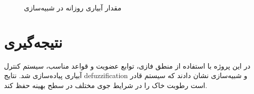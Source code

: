 \documentclass[a4paper,12pt]{article}
\begin{document}
	\begin{figure}[h]
		\centering
		\caption{مقدار آبیاری روزانه در شبیه‌سازی}
	\end{figure}
	
	\section{نتیجه‌گیری}
	در این پروژه با استفاده از منطق فازی، توابع عضویت و قواعد مناسب، سیستم کنترل آبیاری پیاده‌سازی شد. نتایج defuzzification و شبیه‌سازی نشان دادند که سیستم قادر است رطوبت خاک را در شرایط جوی مختلف در سطح بهینه حفظ کند.
	
\end{document}
